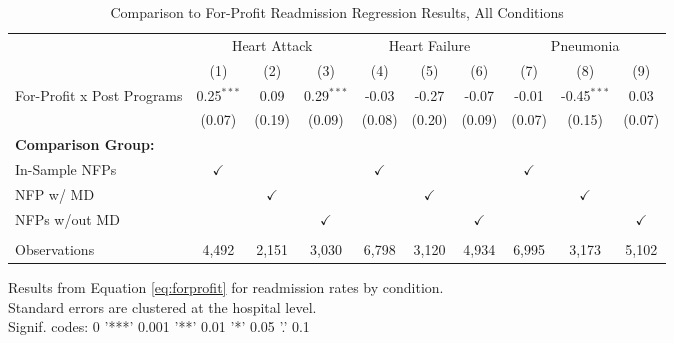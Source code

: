 \begin{table}[ht!]
   \caption{\label{tab:forprofit_read_conditions_fullsample} Comparison to For-Profit Readmission Regression Results, All Conditions}
   \bigskip
   \centering
   \begin{tabular}{lccccccccc}
      \toprule
       & \multicolumn{3}{c}{Heart Attack} & \multicolumn{3}{c}{Heart Failure} & \multicolumn{3}{c}{Pneumonia}\\
                                  & (1)           & (2)           & (3)           & (4)           & (5)           & (6)           & (7)           & (8)           & (9)\\  
      \midrule 
      For-Profit x Post Programs  & 0.25$^{***}$  & 0.09          & 0.29$^{***}$  & -0.03         & -0.27         & -0.07         & -0.01         & -0.45$^{***}$ & 0.03\\   
                                  & (0.07)        & (0.19)        & (0.09)        & (0.08)        & (0.20)        & (0.09)        & (0.07)        & (0.15)        & (0.07)\\   
      \textbf{Comparison Group:}  &               &               &               &               &               &               &               &               & \\  
      In-Sample NFPs              & $\checkmark$  &               &               & $\checkmark$  &               &               & $\checkmark$  &               & \\  
      NFP w/ MD                   &               & $\checkmark$  &               &               & $\checkmark$  &               &               & $\checkmark$  & \\  
      NFPs w/out MD               &               &               & $\checkmark$  &               &               & $\checkmark$  &               &               & $\checkmark$\\   
       \\
      Observations                & 4,492         & 2,151         & 3,030         & 6,798         & 3,120         & 4,934         & 6,995         & 3,173         & 5,102\\  
      \bottomrule
   \end{tabular}
   
   \par \raggedright 
   Results from Equation \ref{eq:forprofit} for readmission rates by condition.\\
   Standard errors are clustered at the hospital level.\\
   Signif. codes: 0 '***' 0.001 '**' 0.01 '*' 0.05 '.' 0.1
\end{table}
